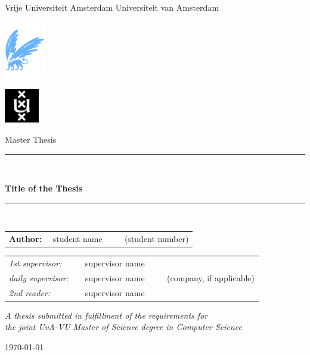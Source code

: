 \documentclass[oneside,11pt]{lib/PhDthesisPSnPDF}
\begin{document}
\thispagestyle{empty}

\begin{center}

	Vrije Universiteit Amsterdam \hspace*{2cm} Universiteit van Amsterdam

	\vspace{1mm}

	\hspace*{-7.5cm}\includegraphics[height=25mm]{figures/front/vu-griffioen.pdf}

	\vspace*{-2cm}\hspace*{7.5cm}\includegraphics[height=15mm]{figures/front/uva_logo.jpg}

	\vspace{2cm}

	{\Large Master Thesis}

	\vspace*{1.5cm}

	\rule{.9\linewidth}{.6pt}\\[0.4cm]
	{\huge \bfseries Title of the Thesis\par}\vspace{0.4cm}
	\rule{.9\linewidth}{.6pt}\\[1.5cm]

	\vspace*{2mm}

	{\Large
		\begin{tabular}{l}
			{\bf Author:} ~~student name ~~~~ (student number)
		\end{tabular}
	}

	\vspace*{2cm}

	\begin{tabular}{ll}
		{\it 1st supervisor:}   & ~~supervisor name                               \\
		{\it daily supervisor:} & ~~supervisor name ~~~~ (company, if applicable) \\
		{\it 2nd reader:}       & ~~supervisor name
	\end{tabular}

	\vspace*{2.5cm}

	\textit{A thesis submitted in fulfillment of the requirements for\\ the joint UvA-VU Master of Science degree in Computer Science}

	\vspace*{1.8cm}

	\today\\[4cm] %

\end{center}
\end{document}
